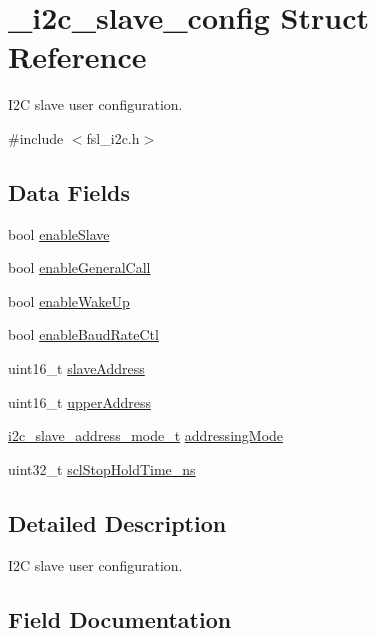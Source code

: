 \hypertarget{struct__i2c__slave__config}{}\section{\+\_\+i2c\+\_\+slave\+\_\+config Struct Reference}
\label{struct__i2c__slave__config}


I2C slave user configuration.  




{\ttfamily \#include $<$fsl\+\_\+i2c.\+h$>$}

\subsection*{Data Fields}
\begin{DoxyCompactItemize}
\item 
bool \mbox{\hyperlink{struct__i2c__slave__config_a9189d8f6438ba99548837da162213c46}{enable\+Slave}}
\item 
bool \mbox{\hyperlink{struct__i2c__slave__config_aedb9cfa838d8a677d9193d5c92298ea4}{enable\+General\+Call}}
\item 
bool \mbox{\hyperlink{struct__i2c__slave__config_af1f3df39054da492f1da50ca792676af}{enable\+Wake\+Up}}
\item 
bool \mbox{\hyperlink{struct__i2c__slave__config_a788ff5c58438afe177059bf0d3c78d5a}{enable\+Baud\+Rate\+Ctl}}
\item 
uint16\+\_\+t \mbox{\hyperlink{struct__i2c__slave__config_a67af74c3fc959654c6dc8bcff3a2ea80}{slave\+Address}}
\item 
uint16\+\_\+t \mbox{\hyperlink{struct__i2c__slave__config_a959e9269b2e7e83f1c4aebac870bf822}{upper\+Address}}
\item 
\mbox{\hyperlink{group__i2c__driver_ga70379ff75d2f4591b8dc1ba107a2a606}{i2c\+\_\+slave\+\_\+address\+\_\+mode\+\_\+t}} \mbox{\hyperlink{struct__i2c__slave__config_a2e946f1dfdd24a753f4c55a6ff3cc2e5}{addressing\+Mode}}
\item 
uint32\+\_\+t \mbox{\hyperlink{struct__i2c__slave__config_addd2f572e0c2ccf835347068518752a8}{scl\+Stop\+Hold\+Time\+\_\+ns}}
\end{DoxyCompactItemize}


\subsection{Detailed Description}
I2C slave user configuration. 

\subsection{Field Documentation}
\mbox{\label{struct__i2c__slave__config_a2e946f1dfdd24a753f4c55a6ff3cc2e5}} 
